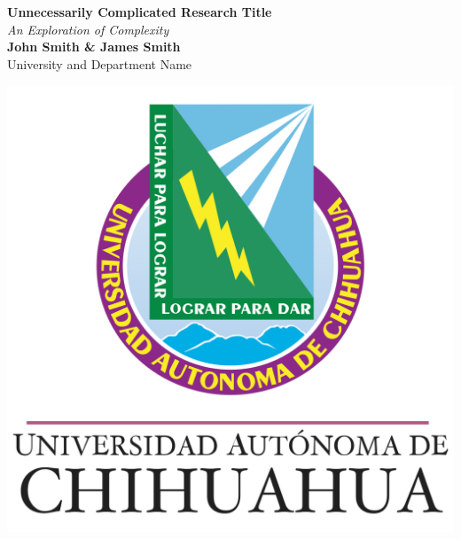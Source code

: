 \documentclass[a0,landscape]{a0poster}
\begin{document}


\begin{minipage}[b]{0.80\linewidth}
\veryHuge \color{NavyBlue} \textbf{Unnecessarily Complicated Research Title} \color{Black}\\ %
\Huge\textit{An Exploration of Complexity}\\[1cm] %
\huge \textbf{John Smith \& James Smith}\\ %
\huge University and Department Name\\ %
\end{minipage}
%
\begin{minipage}[b]{0.19\linewidth}
\includegraphics[width=15cm]{Escudo_UACH.svg.png} %
\end{minipage}
\end{document}
